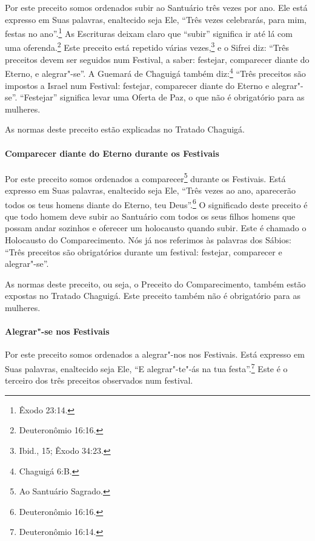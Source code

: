 \begin{multicols}{2}
Por este preceito somos ordenados subir ao Santuário três vezes por ano.
Ele está expresso em Suas palavras, enaltecido seja Ele, ``Três vezes
celebrarás, para mim, festas no ano''.\footnote{Êxodo 23:14.} As Escrituras deixam
claro que ``subir'' significa ir até lá com uma oferenda.\footnote{Deuteronômio 16:16.}
Este preceito está repetido várias vezes,\footnote{Ibid., 15; Êxodo 34:23.} e o
Sifrei\starr{} diz: ``Três preceitos devem ser seguidos num Festival, a saber: festejar, comparecer diante do Eterno, e alegrar"-se''. A Guemará\starr{}
de Chaguigá\starr{} também diz:\footnote{Chaguigá 6:B.} ``Três preceitos são
impostos a Israel num Festival: festejar, comparecer diante do Eterno e alegrar"-se''. ``Festejar'' significa levar uma Oferta de Paz, o que não é obrigatório para as
mulheres.

As normas deste preceito estão explicadas no Tratado Chaguigá\starr.


\paragraph{Comparecer diante do Eterno durante os Festivais}

Por este preceito somos ordenados a comparecer\footnote{Ao Santuário Sagrado.}
durante os Festivais. Está expresso em Suas palavras, enaltecido seja
Ele, ``Três vezes ao ano, aparecerão todos os teus homens diante do
Eterno, teu Deus''.\footnote{Deuteronômio 16:16.} O significado deste preceito é
que todo homem deve subir ao Santuário com todos os seus filhos homens
que possam andar sozinhos e oferecer um holocausto quando subir. Este é
chamado o Holocausto do Comparecimento. Nós já nos referimos às palavras
dos Sábios: ``Três preceitos são obrigatórios durante um festival:
festejar, comparecer e alegrar"-se''.

As normas deste preceito, ou seja, o Preceito do Comparecimento, também
estão expostas no Tratado Chaguigá\starr. Este preceito também não é
obrigatório para as mulheres.

\paragraph{Alegrar"-se nos Festivais}

Por este preceito somos ordenados a alegrar"-nos nos Festivais. Está
expresso em Suas palavras, enaltecido seja Ele, ``E alegrar"-te"-ás na tua
festa''.\footnote{Deuteronômio 16:14.} Este é o terceiro dos três preceitos
observados num festival.


\end{multicols}
